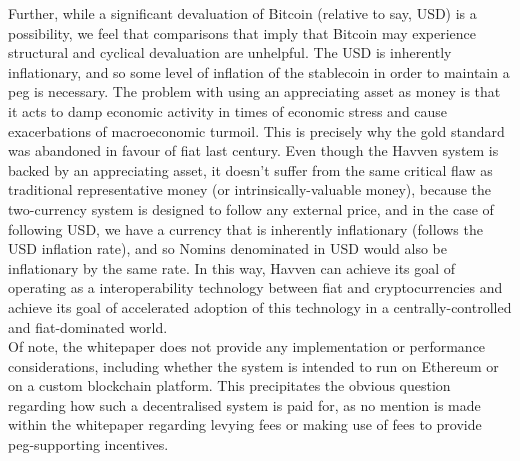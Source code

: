 \noindent Further, while a significant devaluation of Bitcoin (relative to say, USD) is a possibility, we feel that comparisons that imply that Bitcoin may experience structural and cyclical devaluation are unhelpful. The USD is inherently inflationary, and so some level of inflation of the stablecoin in order to maintain a peg is necessary. The problem with using an appreciating asset as money is that it acts to damp economic activity in times of economic stress and cause exacerbations of macroeconomic turmoil. This is precisely why the gold standard was abandoned in favour of fiat last century. Even though the Havven system is backed by an appreciating asset, it doesn't suffer from the same critical flaw as traditional representative money (or intrinsically-valuable money), because the two-currency system is designed to follow any external price, and in the case of following USD, we have a currency that is inherently inflationary (follows the USD inflation rate), and so Nomins denominated in USD would also be inflationary by the same rate. In this way, Havven can achieve its goal of operating as a interoperability technology between fiat and cryptocurrencies and achieve its goal of accelerated adoption of this technology in a centrally-controlled and fiat-dominated world. \\

\noindent Of note, the whitepaper does not provide any implementation or performance considerations, including whether the system is intended to run on Ethereum or on a custom blockchain platform. This precipitates the obvious question regarding how such a decentralised system is paid for, as no mention is made within the whitepaper regarding levying fees or making use of fees to provide peg-supporting incentives. \\

